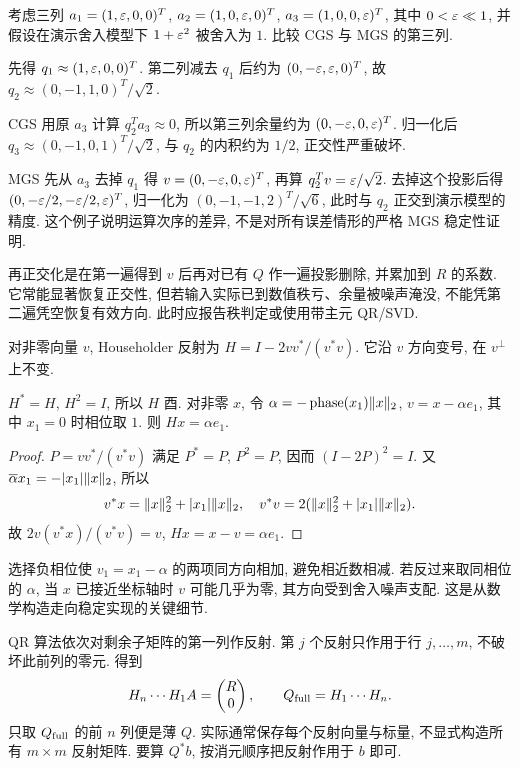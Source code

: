 \begin{example}
考虑三列 $a_1=(1,\varepsilon,0,0)^T$, $a_2=(1,0,\varepsilon,0)^T$, $a_3=(1,0,0,\varepsilon)^T$, 其中 $0<\varepsilon\ll1$, 并假设在演示舍入模型下 $1+\varepsilon^2$ 被舍入为 $1$. 比较 CGS 与 MGS 的第三列.
\end{example}
\begin{solution}
先得 $q_1\approx(1,\varepsilon,0,0)^T$. 第二列减去 $q_1$ 后约为 $(0,-\varepsilon,\varepsilon,0)^T$, 故 $q_2\approx(0,-1,1,0)^T/\sqrt2$.

CGS 用原 $a_3$ 计算 $q_2^Ta_3\approx0$, 所以第三列余量约为 $(0,-\varepsilon,0,\varepsilon)^T$. 归一化后 $q_3\approx(0,-1,0,1)^T/\sqrt2$, 与 $q_2$ 的内积约为 $1/2$, 正交性严重破坏.

MGS 先从 $a_3$ 去掉 $q_1$ 得 $v=(0,-\varepsilon,0,\varepsilon)^T$, 再算 $q_2^Tv=\varepsilon/\sqrt2$. 去掉这个投影后得 $(0,-\varepsilon/2,-\varepsilon/2,\varepsilon)^T$, 归一化为 $(0,-1,-1,2)^T/\sqrt6$, 此时与 $q_2$ 正交到演示模型的精度. 这个例子说明运算次序的差异, 不是对所有误差情形的严格 MGS 稳定性证明.
\end{solution}
再正交化是在第一遍得到 $v$ 后再对已有 $Q$ 作一遍投影删除, 并累加到 $R$ 的系数. 它常能显著恢复正交性, 但若输入实际已到数值秩亏、余量被噪声淹没, 不能凭第二遍凭空恢复有效方向. 此时应报告秩判定或使用带主元 QR/SVD.

\begin{definition}
对非零向量 $v$, Householder 反射为 $H=I-2vv^*/(v^*v)$. 它沿 $v$ 方向变号, 在 $v^\perp$ 上不变.
\end{definition}
\begin{proposition}
$H^*=H$, $H^2=I$, 所以 $H$ 酉. 对非零 $x$, 令 $\alpha=-\operatorname{phase}(x_1)\lVert x\rVert_2$, $v=x-\alpha e_1$, 其中 $x_1=0$ 时相位取 $1$. 则 $Hx=\alpha e_1$.
\end{proposition}
\begin{proof}
$P=vv^*/(v^*v)$ 满足 $P^*=P$, $P^2=P$, 因而 $(I-2P)^2=I$. 又 $\overline\alpha x_1=-|x_1|\lVert x\rVert_2$, 所以
\[
v^*x=\lVert x\rVert_2^2+|x_1|\lVert x\rVert_2,
\quad v^*v=2(\lVert x\rVert_2^2+|x_1|\lVert x\rVert_2).
\]
故 $2v(v^*x)/(v^*v)=v$, $Hx=x-v=\alpha e_1$.
\end{proof}
选择负相位使 $v_1=x_1-\alpha$ 的两项同方向相加, 避免相近数相减. 若反过来取同相位的 $\alpha$, 当 $x$ 已接近坐标轴时 $v$ 可能几乎为零, 其方向受到舍入噪声支配. 这是从数学构造走向稳定实现的关键细节.

QR 算法依次对剩余子矩阵的第一列作反射. 第 $j$ 个反射只作用于行 $j,\ldots,m$, 不破坏此前列的零元. 得到
\[
H_n\cdots H_1 A=\begin{pmatrix}R\\0\end{pmatrix},\qquad
Q_{\rm full}=H_1\cdots H_n.
\]
只取 $Q_{\rm full}$ 的前 $n$ 列便是薄 $Q$. 实际通常保存每个反射向量与标量, 不显式构造所有 $m\times m$ 反射矩阵. 要算 $Q^*b$, 按消元顺序把反射作用于 $b$ 即可.

